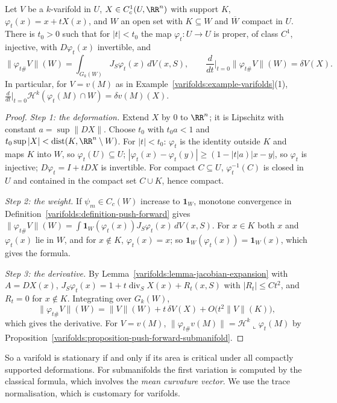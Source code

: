 \begin{proposition}\label{varifolds:proposition-first-variation-area}
Let $V$ be a $k$-varifold in $U$, $X \in C^1_c(U, \RR^n)$ with support $K$, $\varphi_t(x) = x + tX(x)$, and $W$ an open set with $K \subseteq W$ and $\overline{W}$ compact in $U$. There is $t_0 > 0$ such that for
$|t| < t_0$ the map $\varphi_t \colon U \to U$ is proper, of class $C^1$, injective, with $D\varphi_t(x)$ invertible, and
\[
\|\varphi_{t\#}V\|(W) = \int_{G_k(W)}J_S\varphi_t(x)\,dV(x, S), \qquad \frac{d}{dt}\Big|_{t=0}\|\varphi_{t\#}V\|(W) = \delta V(X) .
\]
In particular, for $V = v(M)$ as in Example~\ref{varifolds:example-varifolds}(1), $\frac{d}{dt}\big|_{t=0}\mathcal{H}^k(\varphi_t(M) \cap W) = \delta v(M)(X)$.
\end{proposition}

\begin{proof}
\emph{Step 1: the deformation.} Extend $X$ by $0$ to $\RR^n$; it is Lipschitz with constant $a = \sup\|DX\|$. Choose $t_0$ with $t_0a < 1$ and $t_0\sup|X| < \operatorname{dist}(K, \RR^n \setminus W)$. For
$|t| < t_0$: $\varphi_t$ is the identity outside $K$ and maps $K$ into $W$, so $\varphi_t(U) \subseteq U$; $|\varphi_t(x) - \varphi_t(y)| \geq (1 - |t|a)|x - y|$, so $\varphi_t$ is injective;
$D\varphi_t = I + tDX$ is invertible. For compact $C \subseteq U$, $\varphi_t^{-1}(C)$ is closed in $U$ and contained in the compact set $C \cup K$, hence compact.

\emph{Step 2: the weight.} If $\psi_m \in C_c(W)$ increase to $\mathbf{1}_W$, monotone convergence in Definition~\ref{varifolds:definition-push-forward} gives
$\|\varphi_{t\#}V\|(W) = \int\mathbf{1}_W(\varphi_t(x))J_S\varphi_t(x)\,dV(x, S)$. For $x \in K$ both $x$ and $\varphi_t(x)$ lie in $W$, and for $x \notin K$, $\varphi_t(x) = x$; so
$\mathbf{1}_W(\varphi_t(x)) = \mathbf{1}_W(x)$, which gives the formula.

\emph{Step 3: the derivative.} By Lemma~\ref{varifolds:lemma-jacobian-expansion} with $A = DX(x)$, $J_S\varphi_t(x) = 1 + t\operatorname{div}_SX(x) + R_t(x, S)$ with $|R_t| \leq Ct^2$, and $R_t = 0$ for
$x \notin K$. Integrating over $G_k(W)$,
\[
\|\varphi_{t\#}V\|(W) = \|V\|(W) + t\,\delta V(X) + O\bigl(t^2\|V\|(K)\bigr),
\]
which gives the derivative. For $V = v(M)$, $\|\varphi_{t\#}v(M)\| = \mathcal{H}^k\llcorner\varphi_t(M)$ by Proposition~\ref{varifolds:proposition-push-forward-submanifold}.
\end{proof}

So a varifold is stationary if and only if its area is critical under all compactly supported deformations. For submanifolds the first variation is computed by the classical formula, which involves the
\emph{mean curvature vector}. We use the trace normalisation, which is customary for varifolds.

